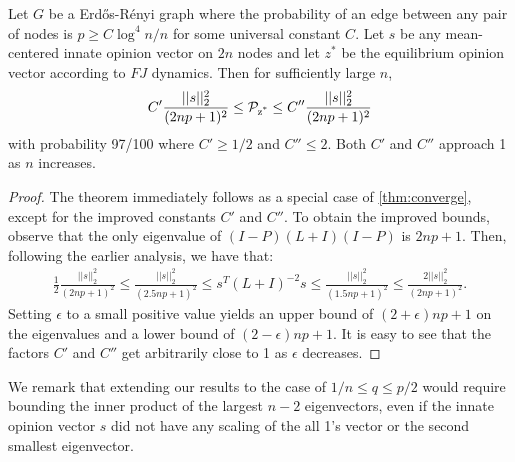 \begin{theorem}
    Let $G$ be a Erdős-Rényi graph where
    the probability of an edge between any pair
    of nodes is $p \geq C \log^4 n/n$ for some
    universal constant $C$.
    Let $s$ be any mean-centered innate opinion
    vector on $2n$ nodes
    and let $z^*$ be the equilibrium opinion vector
    according to $FJ$ dynamics.
    Then for sufficiently large $n$,
    \begin{align}
        C' \frac{||s||_2^2}{(2np+1)^2} \leq \operatorname*{\mathcal{P}_{z^*}} \leq
        C'' \frac{||s||_2^2}{(2np+1)^2}
        \nonumber
    \end{align}
    with probability 97/100 where $C' \geq 1/2$
    and $C'' \leq 2$. Both $C'$ and $C''$ approach
    1 as $n$ increases.
\end{theorem}

\begin{proof}
    The theorem immediately follows as a
    special case of \cref{thm:converge},
    except for the improved constants $C'$ and $C''$.
    To obtain the improved bounds, observe that
    the only eigenvalue of $(I-P)(L+I)(I-P)$
    is $2np+1$.
    Then, following the earlier analysis, we have that:
    \begin{align}
        \frac{1}{2}\frac{||s||_2^2}{(2np+1)^2}
        \leq \frac{||s||_2^2}{(2.5np+1)^2}
        \leq s^T(L+I)^{-2}s
        \leq \frac{||s||_2^2}{(1.5np+1)^2}
        \leq \frac{2||s||_2^2}{(2np+1)^2}.
        \nonumber
    \end{align}
    Setting $\epsilon$ to a small positive value
    yields an upper bound of $(2+\epsilon)np+1$
    on the eigenvalues and a lower bound
    of $(2-\epsilon)np+1$.
    It is easy to see that the factors
    $C'$ and $C''$ get arbitrarily close to 1
    as $\epsilon$ decreases.
    
\end{proof}

We remark that extending our results to the case of
$1/n \leq q \leq p/2$
would require bounding the inner product of the
largest $n-2$ eigenvectors, even if the innate opinion
vector $s$ did not have any scaling of the all 1's
vector or the second smallest eigenvector.


